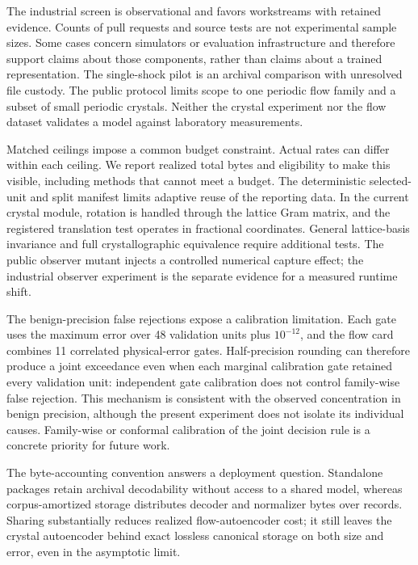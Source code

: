 \documentclass[10pt,a4paper,twocolumn]{article}
\begin{document}
The industrial screen is observational and favors workstreams with retained evidence. Counts of pull requests and source tests are not experimental sample sizes. Some cases concern simulators or evaluation infrastructure and therefore support claims about those components, rather than claims about a trained representation. The single-shock pilot is an archival comparison with unresolved file custody. The public protocol limits scope to one periodic flow family and a subset of small periodic crystals. Neither the crystal experiment nor the flow dataset validates a model against laboratory measurements.

Matched ceilings impose a common budget constraint. Actual rates can differ within each ceiling. We report realized total bytes and eligibility to make this visible, including methods that cannot meet a budget. The deterministic selected-unit and split manifest limits adaptive reuse of the reporting data. In the current crystal module, rotation is handled through the lattice Gram matrix, and the registered translation test operates in fractional coordinates. General lattice-basis invariance and full crystallographic equivalence require additional tests. The public observer mutant injects a controlled numerical capture effect; the industrial observer experiment is the separate evidence for a measured runtime shift.

The benign-precision false rejections expose a calibration limitation. Each gate uses the maximum error over 48 validation units plus $10^{-12}$, and the flow card combines 11 correlated physical-error gates. Half-precision rounding can therefore produce a joint exceedance even when each marginal calibration gate retained every validation unit: independent gate calibration does not control family-wise false rejection. This mechanism is consistent with the observed concentration in benign precision, although the present experiment does not isolate its individual causes. Family-wise or conformal calibration of the joint decision rule is a concrete priority for future work.

The byte-accounting convention answers a deployment question. Standalone packages retain archival decodability without access to a shared model, whereas corpus-amortized storage distributes decoder and normalizer bytes over records. Sharing substantially reduces realized flow-autoencoder cost; it still leaves the crystal autoencoder behind exact lossless canonical storage on both size and error, even in the asymptotic limit.
\end{document}

